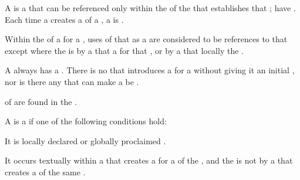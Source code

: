 
A  is a  that can be referenced only within 
the  of the  that establishes that ;
 have .
Each time a  creates a  of a ,
a   is .

Within the  of a  for a  ,
uses of that  as a  are considered to be references
to that  except where the  is  
by a  that  a   for that 
 ,
or by a  that locally  the  .

A  always has a .
There is no  that introduces a  for a
 without giving it an initial , nor
is there any  that can make a  be .

 of  are found in the .

\endsubsubsubsubsection%


A  is a  if one of the following
conditions hold:

\beginlist

 \item{\bull} It is locally declared or globally proclaimed .

 \item{\bull} It occurs textually within a  that
creates a  for a  of the  ,
and the  is not  by a 
that creates a  of the same  .

